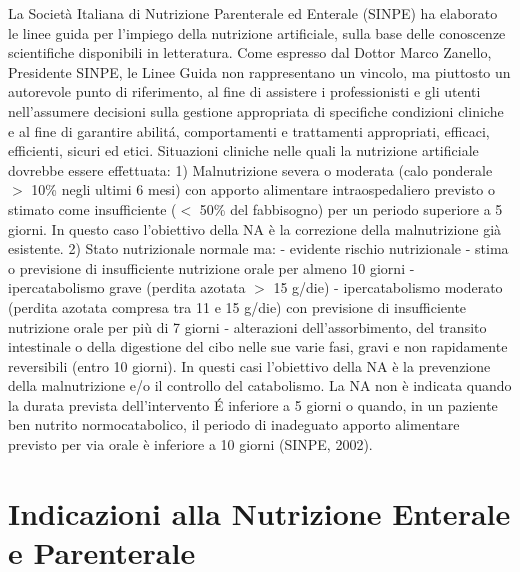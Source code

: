 \documentclass[12pt,a4paper,oneside]{book}
\begin{document}
La Societ\`a Italiana di Nutrizione Parenterale ed Enterale (SINPE) ha elaborato le linee guida per l'impiego della nutrizione artificiale, sulla base delle conoscenze scientifiche disponibili in letteratura. Come espresso dal Dottor Marco Zanello, Presidente SINPE, le Linee Guida non rappresentano un vincolo, ma piuttosto un autorevole punto di riferimento, al fine di assistere i professionisti e gli utenti nell'assumere decisioni sulla gestione appropriata di specifiche condizioni cliniche e al fine di garantire abilit\'a, comportamenti e trattamenti appropriati, efficaci, efficienti, sicuri ed etici. 
Situazioni cliniche nelle quali la nutrizione artificiale dovrebbe essere effettuata: 
1) Malnutrizione severa o moderata (calo ponderale $>$ 10\% negli ultimi 6 mesi) con apporto alimentare intraospedaliero previsto o stimato come insufficiente ($<$ 50\% del fabbisogno) per un periodo superiore a 5 giorni. In questo caso l'obiettivo della NA \`e la correzione della malnutrizione gi\`a esistente.
2) Stato nutrizionale normale ma:
- evidente rischio nutrizionale
- stima o previsione di insufficiente nutrizione orale per almeno 10 giorni
- ipercatabolismo grave (perdita azotata $>$ 15 g/die)
- ipercatabolismo moderato (perdita azotata compresa tra 11 e 15 g/die) con previsione di insufficiente nutrizione orale per pi\`u di 7 giorni 
- alterazioni dell'assorbimento, del transito intestinale o della digestione del cibo nelle sue varie fasi, gravi e non rapidamente reversibili (entro 10 giorni). 
In questi casi l'obiettivo della NA \`e la prevenzione della malnutrizione e/o il controllo del catabolismo. 
La NA non \`e indicata quando la durata prevista dell'intervento \'E inferiore a 5 giorni o quando, in un paziente ben nutrito normocatabolico, il periodo di inadeguato apporto alimentare previsto per via orale \`e inferiore a 10 giorni (SINPE, 2002). 


\section{Indicazioni alla Nutrizione Enterale e Parenterale }
\end{document}
